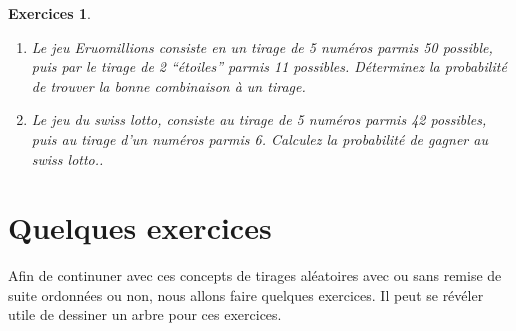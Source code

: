 \documentclass[a4paper,12pt]{book}
\newtheorem*{exercices}{Exercices}
\begin{document}
\begin{exercices}
\hfill\break
 \begin{enumerate}
  \item Le jeu Eruomillions consiste en un tirage de 5 numéros parmis 50 possible, puis par le tirage de 2 ``étoiles'' parmis 11 possibles.
  Déterminez la probabilité de trouver la bonne combinaison à un tirage.
  \item Le jeu du swiss lotto, consiste au tirage de 5 numéros parmis 42 possibles, puis au tirage d'un numéros parmis 6. Calculez la probabilité de 
  gagner au swiss lotto..
 \end{enumerate}
\end{exercices}

\section{Quelques exercices}
Afin de continuner avec ces concepts de tirages aléatoires avec ou sans remise
de suite ordonnées ou non, nous allons faire quelques exercices. Il peut se révéler utile de dessiner un arbre pour ces exercices.
\end{document}
